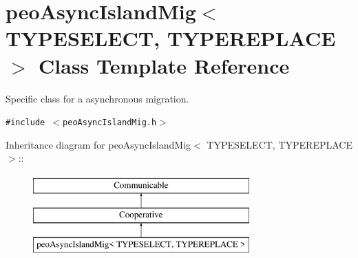 \hypertarget{classpeoAsyncIslandMig}{
\section{peo\-Async\-Island\-Mig$<$ TYPESELECT, TYPEREPLACE $>$ Class Template Reference}
\label{classpeoAsyncIslandMig}
}
Specific class for a asynchronous migration.  


{\tt \#include $<$peo\-Async\-Island\-Mig.h$>$}

Inheritance diagram for peo\-Async\-Island\-Mig$<$ TYPESELECT, TYPEREPLACE $>$::\begin{figure}[H]
\begin{center}
\leavevmode
\includegraphics[height=3cm]{classpeoAsyncIslandMig}
\end{center}
\end{figure}

